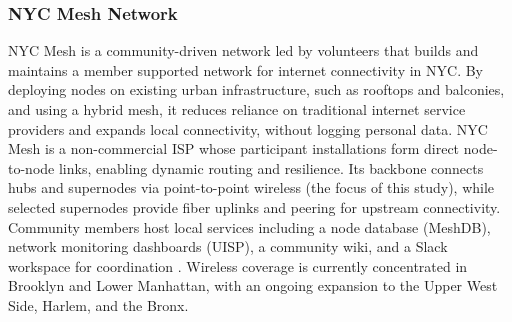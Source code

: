 \documentclass[manuscript]{copernicus}
\begin{document}






\subsubsection{NYC Mesh Network}\label{sec:nyc_mesh}
NYC Mesh \citep{NYCMeshMainSite} is a community-driven network led by volunteers that builds and maintains a member supported network for internet connectivity in NYC. 
By deploying nodes on existing urban infrastructure, such as rooftops and balconies, and using a hybrid mesh, it reduces reliance on traditional internet service providers and expands local connectivity, without logging personal data.
NYC Mesh is a non-commercial ISP whose participant installations form direct node-to-node links, enabling dynamic routing and resilience. Its backbone connects hubs and supernodes via point-to-point wireless (the focus of this study), while selected supernodes provide fiber uplinks and peering for upstream connectivity. Community members host local services including a node database (MeshDB), network monitoring dashboards (UISP), a community wiki, and a Slack workspace for coordination \citep{NYCMeshWiki2025,NYCMeshGitHub2025,NYCMeshMainSite}.
Wireless coverage is currently concentrated in Brooklyn and Lower Manhattan, with an ongoing expansion to the Upper West Side, Harlem, and the Bronx.
\end{document}
